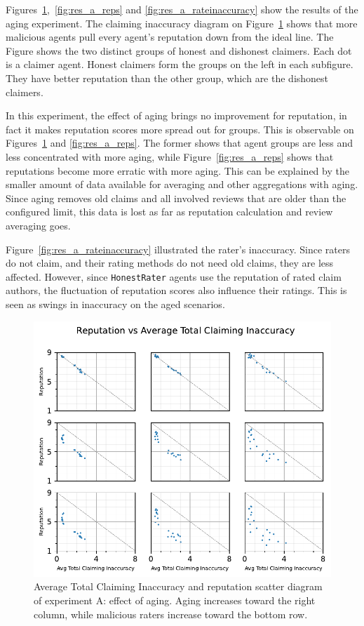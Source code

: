 \documentclass[%
    ]{\PathToTumTemplate/thesis/tum_thesis}
\begin{document}
Figures~\ref{fig:res_a_scatter},~\ref{fig:res_a_reps} and \ref{fig:res_a_rateinaccuracy} show the results of the aging experiment.
The claiming inaccuracy diagram on Figure~\ref{fig:res_a_scatter} shows that more malicious agents pull every agent's reputation down from the ideal line.
The Figure shows the two distinct groups of honest and dishonest claimers.
Each dot is a claimer agent.
Honest claimers form the groups on the left in each subfigure.
They have better reputation than the other group, which are the dishonest claimers.

In this experiment, the effect of aging brings no improvement for reputation, in fact it makes reputation scores more spread out for groups.
This is observable on Figures~\ref{fig:res_a_scatter} and \ref{fig:res_a_reps}.
The former shows that agent groups are less and less concentrated with more aging, while Figure~\ref{fig:res_a_reps} shows that reputations become more erratic with more aging.
This can be explained by the smaller amount of data available for averaging and other aggregations with aging.
Since aging removes old claims and all involved reviews that are older than the configured limit, this data is lost as far as reputation calculation and review averaging goes.

Figure~\ref{fig:res_a_rateinaccuracy} illustrated the rater's inaccuracy. Since raters do not claim, and their rating methods do not need old claims, they are less affected. 
However, since \texttt{HonestRater} agents use the reputation of rated claim authors, the fluctuation of reputation scores also influence their ratings. 
This is seen as swings in inaccuracy on the aged scenarios.

\begin{figure}[tbp]
  \begin{center}
        \includegraphics[width=0.75\linewidth]	{../results/a/AvgTotClaimInaccuracyAndReputationScatter_joined.pdf}
    \caption{
    Average Total Claiming Inaccuracy and reputation scatter diagram of experiment A: effect of aging.
    Aging increases toward the right column, while malicious raters increase toward the bottom row.
    }
    \label{fig:res_a_scatter}
  \end{center}
\end{figure}
\end{document}
